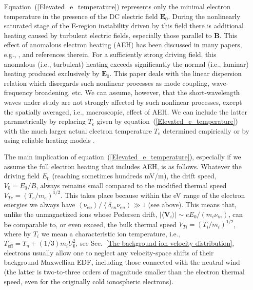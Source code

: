 \documentclass[draft]{agujournal2019}
\renewcommand{\vec}{\mathbf}
\begin{document}

Equation~(\ref{Elevated_e_temperature}) represents only the minimal electron
temperature in the presence of the DC electric field $\vec{E}_{0}$. During the
nonlinearly saturated stage of the E-region instability driven by this field
there is additional heating caused by turbulent electric fields, especially
those parallel to $\vec{B}$. This effect of anomalous electron heating (AEH)
has been discussed in many papers, e.g.,
, and references
therein. For a sufficiently strong driving field, this anomalous
(i.e., turbulent) heating exceeds significantly the normal (i.e., laminar) heating
produced exclusively by $\vec{E}_{0}$. This paper deals with the linear
dispersion relation which disregards such nonlinear processes as mode
coupling, wave-frequency broadening, etc. We can assume, however, that the
short-wavelength waves under study are not strongly affected by such nonlinear
processes, except the spatially averaged, i.e., macroscopic, effect of AEH. We can
include the latter parametrically by replacing $T_{e}$ given by
equation~(\ref{Elevated_e_temperature}) with the much larger actual electron
temperature $T_{e}$ determined empirically or by using reliable heating models
\cite{Dimant:Model03,Milikh:Model03,Hysell:Implications13,St-Maurice:Revisiting21,Liang:Time-dependent21}.

The main implication of equation~(\ref{Elevated_e_temperature}), especially if
we assume the full electron heating that includes AEH, is as follows. Whatever the
driving field $E_{0}$ (reaching sometimes hundreds mV/m), the
drift speed, $V_{0}=E_{0}/B$, always remains small compared to the modified
thermal speed $V_{Te}=(T_{e}/m_{e})^{1/2}$. This takes place because within
the eV range of the electron energies we always have $\left\langle \nu
_{en}\right\rangle /\left\langle \delta_{en}\nu_{en}\right\rangle \gg1$ (see
above). This means that, unlike the unmagnetized ions whose Pedersen drift,
$|\langle \vec{V}_{i}\rangle| \sim
eE_{0}/(m_{i}\nu_{in})$, can be comparable to, or even exceed, the 
bulk thermal speed $V_{Ti}=(T_{i}/m_{i})^{1/2}$, where by $T_i$ we mean a characteristic 
ion temperature, i.e., $T_{\mathrm{eff}}=T_{n}+(1/3)m_i U_{0}^{2}$, see
Sec.~\ref{The background ion velocity distribution}, electrons usually allow
one to neglect any velocity-space shifts of their background Maxwellian EDF,
including those connected with the neutral wind (the latter is two-to-three orders
of magnitude smaller than the electron thermal speed, even for the originally
cold ionospheric electrons).
\end{document}
